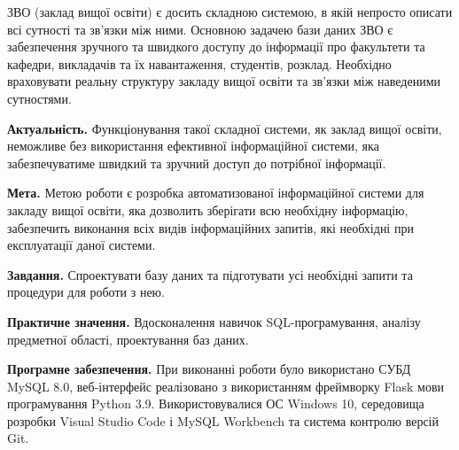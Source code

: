 \newpage
{}

ЗВО (заклад вищої освіти) є досить складною системою, в якій непросто описати всі
сутності та зв'язки між ними. Основною задачею бази даних ЗВО є забезпечення зручного
та швидкого доступу до інформації про факультети та кафедри, викладачів та їх навантаження, студентів, розклад.
Необхідно враховувати реальну структуру закладу вищої освіти та зв'язки між наведеними сутностями.

\textbf{Актуальність.} Функціонування такої складної системи, як заклад вищої освіти,
неможливе без використання ефективної інформаційної системи, яка забезпечуватиме 
швидкий та зручний доступ до потрібної інформації.

\textbf{Мета.} Метою роботи є розробка автоматизованої інформаційної системи
для закладу вищої освіти, яка дозволить зберігати всю необхідну інформацію, забезпечить 
виконання всіх видів інформаційних запитів, які необхідні при експлуатації даної 
системи.

\textbf{Завдання.} Спроектувати базу даних та підготувати усі необхідні 
запити та процедури для роботи з нею.

\textbf{Практичне значення.} Вдосконалення навичок SQL-програмування,
аналізу предметної області, проектування баз даних.

\textbf{Програмне забезпечення.} При виконанні роботи було використано
СУБД MySQL 8.0, веб-інтерфейс реалізовано з використанням фреймворку Flask
мови програмування Python 3.9. Використовувалися ОС Windows 10, середовища розробки
Visual Studio Code і MySQL Workbench та система контролю версій Git.